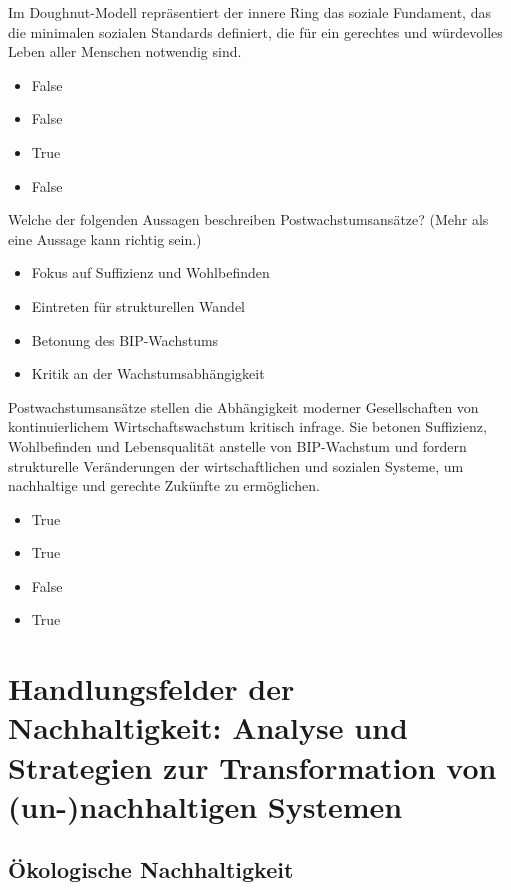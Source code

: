 \documentclass[
  nswissgerman,
  a4paper,
  DIV=11,
  numbers=noendperiod,
  oneside,
  openany]{scrreprt}
\providecommand{\tightlist}{%
  \setlength{\itemsep}{0pt}\setlength{\parskip}{0pt}}
\begin{document}
Im Doughnut-Modell repräsentiert der innere Ring das soziale Fundament,
das die minimalen sozialen Standards definiert, die für ein gerechtes
und würdevolles Leben aller Menschen notwendig sind.

\begin{itemize}
\tightlist
\item
  False
\item
  False
\item
  True
\item
  False
\end{itemize}

Welche der folgenden Aussagen beschreiben Postwachstumsansätze? (Mehr
als eine Aussage kann richtig sein.)

\begin{itemize}
\tightlist
\item[$\square$]
  Fokus auf Suffizienz und Wohlbefinden
\item[$\square$]
  Eintreten für strukturellen Wandel
\item[$\square$]
  Betonung des BIP-Wachstums
\item[$\square$]
  Kritik an der Wachstumsabhängigkeit
\end{itemize}

Postwachstumsansätze stellen die Abhängigkeit moderner Gesellschaften
von kontinuierlichem Wirtschaftswachstum kritisch infrage. Sie betonen
Suffizienz, Wohlbefinden und Lebensqualität anstelle von BIP-Wachstum
und fordern strukturelle Veränderungen der wirtschaftlichen und sozialen
Systeme, um nachhaltige und gerechte Zukünfte zu ermöglichen.

\begin{itemize}
\tightlist
\item
  True
\item
  True
\item
  False
\item
  True
\end{itemize}

\part{Handlungsfelder der Nachhaltigkeit: Analyse und Strategien zur
Transformation von (un-)nachhaltigen Systemen}

\chapter{Ökologische
Nachhaltigkeit}\label{uxf6kologische-nachhaltigkeit}
\end{document}
